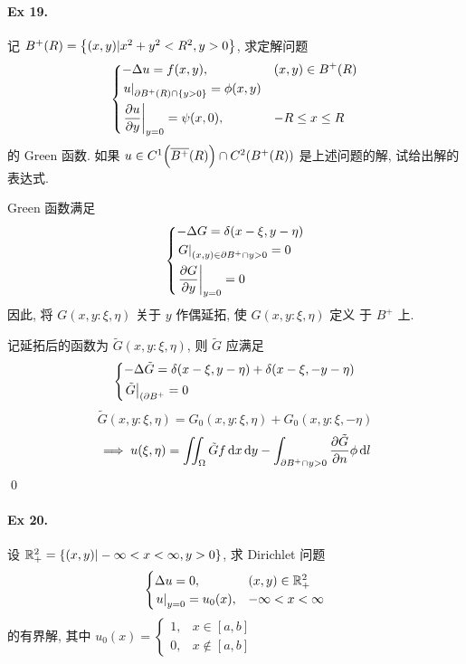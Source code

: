 \paragraph{Ex 19.}
记 $B^{+}(R) = {\left\{ {(x, y)| x^2 + y^2 < R^2, y > 0} \right\}}$, 求定解问题
\[\begin{dcases}
-\Delta u = f(x, y), & (x, y) \in B^{+}(R) \\
{\left.{u} \right|}_{\partial B^{+}(R) \cap \{y>0\}} = \phi(x, y) \\
{\left.{{\frac{\partial {u}}{\partial {y}}}} \right|}_{y=0} = \psi(x, 0), & -R \leq x \leq R
\end{dcases} \]
的 Green 函数. 如果
$u \in C^1{\left( {\overline{B^{+}}{\left( {R} \right)}} \right)} \cap C^2{\left( {B^{+}(R)} \right)}$
是上述问题的解, 试给出解的表达式.

\begin{solution}
Green 函数满足
\[\begin{dcases}
-\Delta G = \delta(x - \xi, y - \eta) \\
{\left.{G} \right|}_{(x, y) \in \partial B^{+} \cap {y>0}} = 0 \\
{\left.{{\frac{\partial {G}}{\partial {y}}}} \right|}_{y=0} = 0
\end{dcases} \]
因此, 将 $G(x, y : \xi, \eta)$ 关于 $y$ 作偶延拓, 使 $G(x, y : \xi, \eta)$ 定义
于 $B^{+}$ 上.

记延拓后的函数为 $\tilde{G}(x, y : \xi, \eta)$, 则 $\tilde{G}$ 应满足
\[\begin{dcases}
-\Delta \tilde{G} = \delta(x - \xi, y - \eta) + \delta(x - \xi, -y - \eta) \\
{\left.{\tilde{G}} \right|}_{(\partial B^{+}} = 0
\end{dcases} \]
\[ \tilde{G}(x, y : \xi, \eta)=G_0(x, y : \xi, \eta)+G_0(x, y : \xi, -\eta) \]
\[ \implies u(\xi, \eta) = \iint_\Omega \tilde{G}f\operatorname{d\!} x\operatorname{d\!} y
-\int_{\partial B^{+} \cap {y>0}} {\frac{\partial {\tilde{G}}}{\partial {n}}}\phi \operatorname{d\!} l \]
\qed
\end{solution}


\paragraph{Ex 20.}
设 ${\mathbb R}^2_{+} = {\left\{ {(x, y)|-\infty<x<\infty, y>0} \right\}}$, 求 Dirichlet
问题
\[\begin{cases}
\Delta u = 0, & (x, y) \in {\mathbb R}^2_{+} \\
{\left.{u} \right|}_{y=0} = u_0(x), & -\infty < x < \infty
\end{cases} \]
的有界解, 其中
$u_0(x) = \begin{cases}1, & x\in[a, b] \\ 0, & x \notin[a, b]\end{cases}$

